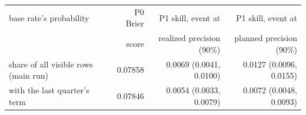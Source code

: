 \begin{tabular}{lrrr}
\toprule
base rate's probability & P0 Brier & P1 skill, event at & P1 skill, event at \\
 & score & realized precision (90\%) & planned precision (90\%) \\
\midrule
share of all visible rows (main run) & 0.07858 & 0.0069 (0.0041, 0.0100) & 0.0127 (0.0096, 0.0155) \\
with the last quarter's term & 0.07846 & 0.0054 (0.0033, 0.0079) & 0.0072 (0.0048, 0.0093) \\

\end{tabular}

